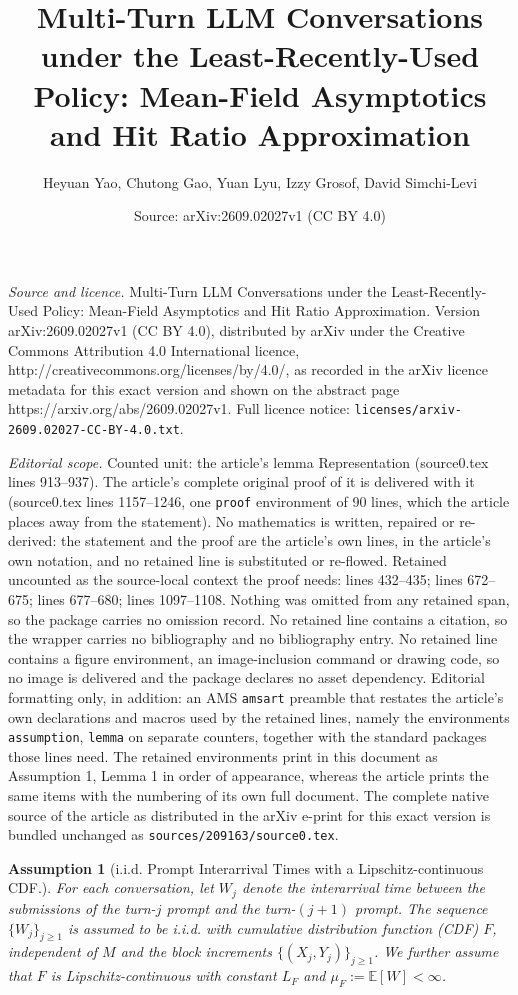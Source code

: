 \documentclass[10pt,a4paper]{amsart}
\title{Multi-Turn LLM Conversations under the Least-Recently-Used Policy: Mean-Field Asymptotics and Hit Ratio Approximation}
\author{Heyuan Yao, Chutong Gao, Yuan Lyu, Izzy Grosof, David Simchi-Levi}
\date{Source: arXiv:2609.02027v1 (CC BY 4.0)}
\newtheorem{assumption}{Assumption}
\newcommand{\E}{\mathbb E}
\begin{document}
\maketitle

\noindent\emph{Source and licence.} Multi-Turn LLM Conversations under the Least-Recently-Used Policy: Mean-Field Asymptotics and Hit Ratio Approximation. Version arXiv:2609.02027v1 (CC BY 4.0), distributed by arXiv under the Creative Commons Attribution 4.0 International licence, http://creativecommons.org/licenses/by/4.0/, as recorded in the arXiv licence metadata for this exact version and shown on the abstract page https://arxiv.org/abs/2609.02027v1. Full licence notice: \texttt{licenses/arxiv-2609.02027-CC-BY-4.0.txt}.\par\smallskip

\noindent\textit{Editorial scope.} Counted unit: the article's lemma Representation (source0.tex lines 913--937). The article's complete original proof of it is delivered with it (source0.tex lines 1157--1246, one \texttt{proof} environment of 90 lines, which the article places away from the statement). No mathematics is written, repaired or re-derived: the statement and the proof are the article's own lines, in the article's own notation, and no retained line is substituted or re-flowed.  Retained uncounted as the source-local context the proof needs: lines 432--435; lines 672--675; lines 677--680; lines 1097--1108.  Nothing was omitted from any retained span, so the package carries no omission record.  No retained line contains a citation, so the wrapper carries no bibliography and no bibliography entry.  No retained line contains a figure environment, an image-inclusion command or drawing code, so no image is delivered and the package declares no asset dependency.  Editorial formatting only, in addition: an AMS \texttt{amsart} preamble that restates the article's own declarations and macros used by the retained lines, namely the environments \texttt{assumption}, \texttt{lemma} on separate counters, together with the standard packages those lines need.  The retained environments print in this document as Assumption 1, Lemma 1 in order of appearance, whereas the article prints the same items with the numbering of its own full document.  The complete native source of the article as distributed in the arXiv e-print for this exact version is bundled unchanged as \texttt{sources/209163/source0.tex}.
\begin{assumption}[i.i.d. Prompt Interarrival Times with a Lipschitz-continuous CDF.]
    \label{ass: Exponential Prompt Inter-arrival Time}
    For each conversation, let $W_j$ denote the interarrival time between the submissions of the turn-$j$ prompt and the turn-$(j+1)$ prompt. The sequence $\{W_j\}_{j\geq1}$ is assumed to be i.i.d. with cumulative distribution function (CDF) $F$, independent of $M$ and the block increments $\{(X_j,Y_j)\}_{j\geq1}$. We further assume that $F$ is Lipschitz-continuous with constant $L_F$ and $\mu_F:= \E [W] <\infty$.
\end{assumption}
\end{document}
